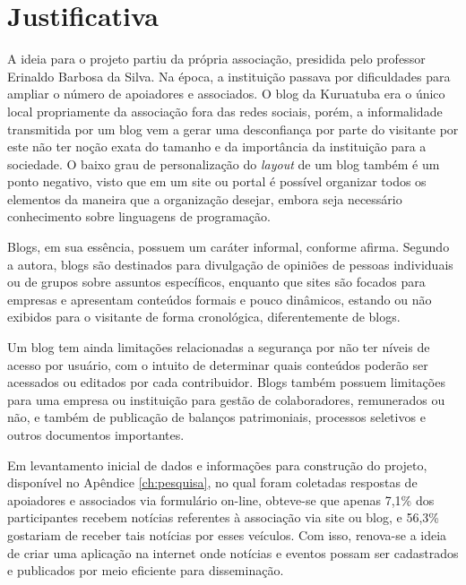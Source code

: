 \hspace{2.5cm}
\section{Justificativa}
\hspace{2.5cm}

A ideia para o projeto partiu da própria associação, presidida pelo professor Erinaldo Barbosa da Silva. Na época, a instituição passava por dificuldades para ampliar o número de apoiadores e associados. O blog da Kuruatuba era o único local propriamente da associação fora das redes sociais, porém, a informalidade transmitida por um blog vem a gerar uma desconfiança por parte do visitante por este não ter noção exata do tamanho e da importância da instituição para a sociedade. O baixo grau de personalização do \textit{layout} de um blog também é um ponto negativo, visto que em um site ou portal é possível organizar todos os elementos da maneira que a organização desejar, embora seja necessário conhecimento sobre linguagens de programação. 

Blogs, em sua essência, possuem um caráter informal, conforme  afirma. Segundo a autora, blogs são destinados para divulgação de opiniões de pessoas individuais ou de grupos sobre assuntos específicos, enquanto que sites são focados para empresas e apresentam conteúdos formais e pouco dinâmicos, estando ou não exibidos para o visitante de forma cronológica, diferentemente de blogs. 

Um blog tem ainda limitações relacionadas a segurança por não ter níveis de acesso por usuário, com o intuito de determinar quais conteúdos poderão ser acessados ou editados por cada contribuidor. Blogs também possuem limitações para uma empresa ou instituição para gestão de colaboradores, remunerados ou não, e também de publicação de balanços patrimoniais, processos seletivos e outros documentos importantes. 

Em levantamento inicial de dados e informações para construção do projeto, disponível no Apêndice \ref{ch:pesquisa}, no qual foram coletadas respostas de apoiadores e associados via formulário on-line, obteve-se que apenas 7,1\% dos participantes recebem notícias referentes à associação via site ou blog, e 56,3\% gostariam de receber tais notícias por esses veículos. Com isso, renova-se a ideia de criar uma aplicação na internet onde notícias e eventos possam ser cadastrados e publicados por meio eficiente para disseminação.

